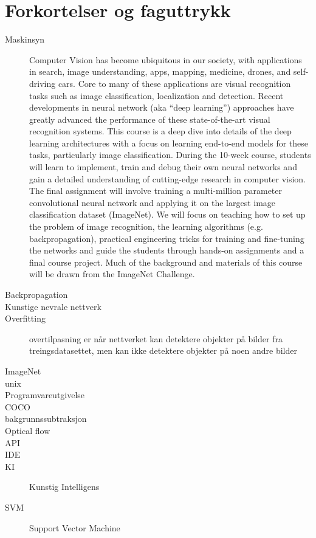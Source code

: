 \section*{Forkortelser og faguttrykk}

\begin{description}

\item[Maskinsyn] Computer Vision has become ubiquitous in our society, with applications in search, image understanding, apps, mapping, medicine, drones, and self-driving cars. Core to many of these applications are visual recognition tasks such as image classification, localization and detection. Recent developments in neural network (aka “deep learning”) approaches have greatly advanced the performance of these state-of-the-art visual recognition systems. This course is a deep dive into details of the deep learning architectures with a focus on learning end-to-end models for these tasks, particularly image classification. During the 10-week course, students will learn to implement, train and debug their own neural networks and gain a detailed understanding of cutting-edge research in computer vision. The final assignment will involve training a multi-million parameter convolutional neural network and applying it on the largest image classification dataset (ImageNet). We will focus on teaching how to set up the problem of image recognition, the learning algorithms (e.g. backpropagation), practical engineering tricks for training and fine-tuning the networks and guide the students through hands-on assignments and a final course project. Much of the background and materials of this course will be drawn from the ImageNet Challenge.
\item[Backpropagation]
\item[Kunstige nevrale nettverk]
\item[Overfitting] overtilpasning er når nettverket kan detektere objekter på bilder fra treingsdatasettet, men kan ikke detektere objekter på noen andre bilder
\item[ImageNet]
\item[unix]
\item[Programvareutgivelse]
\item[COCO]
\item[bakgrunnssubtraksjon]
\item[Optical flow]
\item[API]
\item[IDE]
\item[KI] Kunstig Intelligens
\item[SVM] Support Vector Machine

\end{description}
